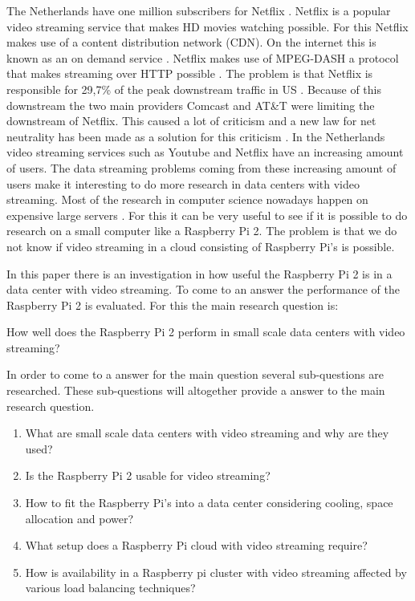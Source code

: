 \documentclass{sig-alternate-br}
\begin{document}
The Netherlands have one million subscribers for Netflix \cite{volkskrant}. Netflix is a popular video streaming service that makes HD movies watching possible. For this Netflix makes use of a content distribution network (CDN). On the internet this is known as an on demand service \cite{Adhikari:2012}. Netflix makes use of MPEG-DASH a protocol that makes streaming over HTTP possible \cite{martin:2013}. The problem is that Netflix is responsible for  29,7\% of the peak downstream traffic in US \cite{Adhikari:2012}. Because of this downstream the two main providers Comcast and  AT\&T were limiting the downstream of Netflix. This caused a lot of criticism and a new law for net neutrality has been made as a solution for this criticism \cite{net-neutrality}. \newline
In the Netherlands video streaming services such as Youtube and Netflix have an increasing amount of users. The data streaming problems coming from these increasing amount of users make it interesting to do more research in data centers with video streaming. Most of the research in computer science nowadays happen on expensive large servers \cite{tso:2013}. For this it can be very useful to see if it is possible to do research on a small computer like a Raspberry Pi 2. The problem is that we do not know if video streaming in a cloud consisting of Raspberry Pi's is possible. 

In this paper there is an investigation in how useful the Raspberry Pi 2 is in a data center with video streaming. To come to an answer the performance of the Raspberry Pi 2 is evaluated. For this the main research question is: 
\begin{center}
How well does the Raspberry Pi 2 perform in small scale data centers with video streaming? 
\end{center}

In order to come to a answer for the main question several sub-questions are researched. These sub-questions will altogether provide a answer to the main research question. 

\begin{enumerate}
	\item What are small scale data centers with video streaming and why are they used?
	\item Is the Raspberry Pi 2 usable for video streaming?
	\item How to fit the Raspberry Pi's into a data center considering cooling, space allocation and power?
	\item What setup does a Raspberry Pi cloud with video streaming require?
	\item How is availability in a Raspberry pi cluster with video streaming affected by various load balancing techniques? 
\end{enumerate}
\end{document}

